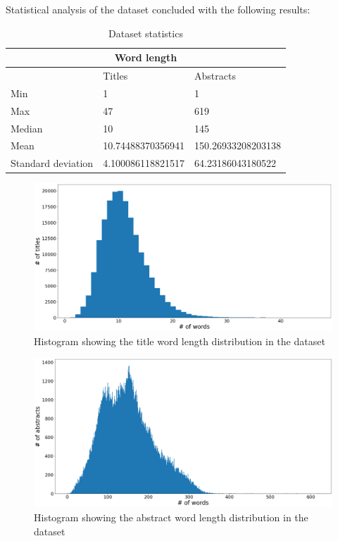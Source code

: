 \documentclass{article}
\begin{document}
Statistical analysis of the dataset concluded with the following results:

\begin{table}[H]
    \centering
    \begin{tabular}{l|l|l}
        \toprule
        \multicolumn{3}{c}{Word length} \\
        \hline
        & Titles & Abstracts \\
        \hline
        \midrule
        Min & 1 & 1\\
        Max & 47 & 619\\
        Median & 10 & 145\\
        Mean & 10.74488370356941 & 150.26933208203138\\
        Standard deviation & 4.100086118821517 & 64.23186043180522\\
        \bottomrule
    \end{tabular}
    \caption{Dataset statistics}
    \label{fig:word_len_stats}
\end{table}

\begin{figure}[H]
    \centering
    \includegraphics[scale=0.3]{images/titles_words_hist.png}
    \caption{Histogram showing the title word length distribution in the dataset}
\end{figure}

\begin{figure}[H]
    \centering
    \includegraphics[scale=0.3]{images/abstracts_words_hist.png}
    \caption{Histogram showing the abstract word length distribution in the dataset}
\end{figure}
\end{document}
